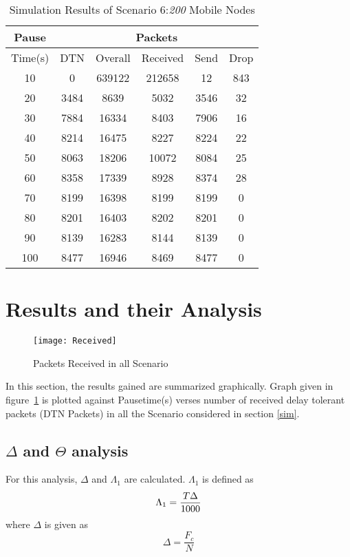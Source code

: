 \documentclass[3p,times]{elsarticle}
\begin{document}
\begin{table}[t!]
\caption{Simulation Results of Scenario 6:\emph{200} Mobile Nodes}
\label{t14}
\centering
\begin{tabular}{|c|c|c|c|c|c|}
\hline
Pause  & \multicolumn{5}{c|}{Packets} \\
\hline
Time(s) & DTN   & Overall & Received & Send & Drop \\
\hline
10 & 0 & 639122 & 212658 & 12 & 843\\
20 & 3484 & 8639 & 5032 & 3546 & 32\\
30 & 7884 & 16334 & 8403 & 7906 & 16\\
40 & 8214 & 16475 & 8227 & 8224 & 22\\
50 & 8063 & 18206 & 10072 & 8084 & 25\\
60 & 8358 & 17339 & 8928 & 8374 & 28\\
70 & 8199 & 16398 & 8199 & 8199 & 0\\
80 & 8201 & 16403 & 8202 & 8201 & 0\\
90 & 8139 & 16283 & 8144 & 8139 & 0\\
100 & 8477 & 16946 & 8469 & 8477 & 0\\
\hline
\end{tabular}
\end{table}

\section{Results and their Analysis} \label{res}
\begin{figure}[h]
\centering
\mbox{\texttt{[image: Received]}}
\caption{Packets Received in all Scenario}
\label{g1}
\end{figure}
In this section, the results gained are summarized graphically. Graph given in figure~\ref {g1} is plotted against Pausetime(s) verses number of received delay tolerant packets (DTN Packets) in all the Scenario considered in section \ref{sim}. 
\subsection{$\Delta$ and $\Theta$ analysis}
For this analysis, $ \Delta$ and $\Lambda_1$ are calculated. $ \Lambda_1 $  is defined as 
\begin{equation}
\Lambda_1   =  \frac {T  \* \Delta}{1000}  
\end{equation}
where $\Delta$ is given as 
\begin{equation} 
\Delta =  \frac{F_c}{N} 
\end{equation}
\end{document}
